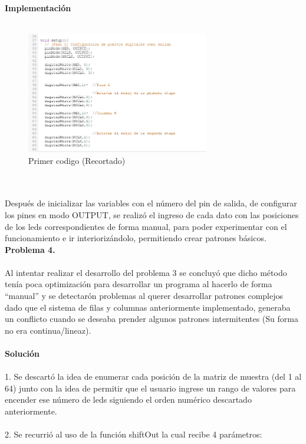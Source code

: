 \documentclass{article}
\begin{document}
\textbf{\large Implementación}\\\\
\begin{figure}[h]
    \includegraphics[width=8cm]{Imagen3.png}
    \centering
    \caption{Primer codigo (Recortado)}
    \label{fig:Imagen3}
\end{figure}\\\\

Después de inicializar las variables con el número del pin de salida, de configurar los pines en modo OUTPUT, se realizó el ingreso de cada dato con las posiciones de los leds correspondientes de forma manual, para poder experimentar con el funcionamiento e ir interiorizándolo, permitiendo crear patrones básicos.\\

\textbf{\large Problema 4.}\\\\
Al intentar realizar el desarrollo del problema 3 se concluyó que dicho método tenía poca optimización para desarrollar un programa al hacerlo de forma “manual” y se detectarón problemas al querer desarrollar patrones complejos dado que el sistema de filas y columnas anteriormente implementado, generaba un conflicto cuando se deseaba prender algunos patrones intermitentes (Su forma no era continua/lineaz). \\\\

\textbf{\large Solución}\\\\
1. Se descartó la idea de enumerar cada posición de la matriz de muestra (del 1 al 64) junto con la idea de permitir que el usuario ingrese un rango de valores para encender ese número de leds siguiendo el orden numérico descartado anteriormente.\\\\
2. Se recurrió al uso de la función shiftOut la cual recibe 4 parámetros:\\
\end{document}
